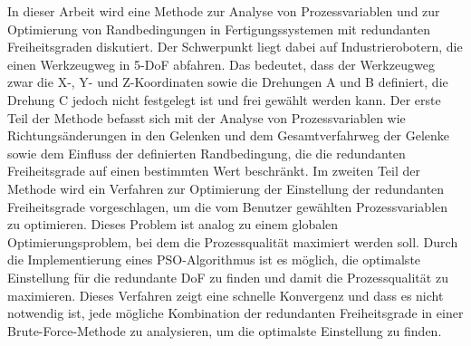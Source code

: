 {%
	In dieser Arbeit wird eine Methode zur Analyse von Prozessvariablen und zur Optimierung von Randbedingungen in Fertigungssystemen mit redundanten Freiheitsgraden diskutiert. Der Schwerpunkt liegt dabei auf Industrierobotern, die einen Werkzeugweg in 5-DoF abfahren. Das bedeutet, dass der Werkzeugweg zwar die X-, Y- und Z-Koordinaten sowie die Drehungen A und B definiert, die Drehung C jedoch nicht festgelegt ist und frei gewählt werden kann. Der erste Teil der Methode befasst sich mit der Analyse von Prozessvariablen wie Richtungsänderungen in den Gelenken und dem Gesamtverfahrweg der Gelenke sowie dem Einfluss der definierten Randbedingung, die die redundanten Freiheitsgrade auf einen bestimmten Wert beschränkt.
	Im zweiten Teil der Methode wird ein Verfahren zur Optimierung der Einstellung der redundanten Freiheitsgrade vorgeschlagen, um die vom Benutzer gewählten Prozessvariablen zu optimieren. Dieses Problem ist analog zu einem globalen Optimierungsproblem, bei dem die Prozessqualität maximiert werden soll. Durch die Implementierung eines \acrshort{PSO}-Algorithmus ist es möglich, die optimalste Einstellung für die redundante DoF zu finden und damit die Prozessqualität zu maximieren. Dieses Verfahren zeigt eine schnelle Konvergenz und dass es nicht notwendig ist, jede mögliche Kombination der redundanten Freiheitsgrade in einer Brute-Force-Methode zu analysieren, um die optimalste Einstellung zu finden.
}%
%
%
